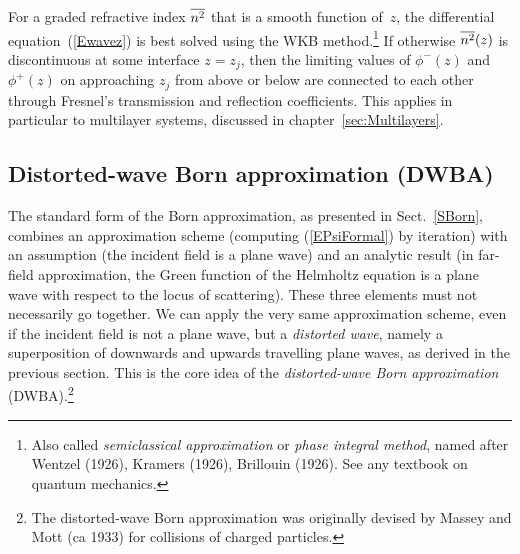 For a graded refractive index
%
$\overline{n^2}$ that is a smooth function of~$z$,
the differential equation~(\ref{Ewavez}) is best solved
using the WKB method.\footnote
{Also called \textit{semiclassical approximation} or
\textit{phase integral method},
named after Wentzel (1926), Kramers (1926), Brillouin (1926).
See any textbook on quantum mechanics.}
%
%
%
If otherwise $\overline{n^2}(z)$ is discontinuous at some interface $z=z_j$,
then the limiting values of $\phi^-(z)$ and $\phi^+(z)$
on approaching $z_j$ from above or below
are connected to each other through Fresnel's
transmission and reflection coefficients.
%
This applies in particular to multilayer systems,
discussed in chapter~\ref{sec:Multilayers}.

\subsection{Distorted-wave Born approximation (DWBA)}\label{SDWBA}

%
%

The standard form of the Born approximation,
as presented in Sect.~\ref{SBorn},
combines an approximation scheme
(computing (\ref{EPsiFormal}) by iteration)
with an assumption (the incident field is a plane wave)
and an analytic result
(in far-field approximation,
the Green function of the Helmholtz equation is a plane wave
with respect to the locus of scattering).
These three elements must not necessarily go together.
We can apply the very same approximation scheme,
even if the incident field is not a plane wave,
but a \textit{distorted wave},
namely a superposition of downwards and upwards travelling plane waves,
as derived in the previous section.
This is the core idea
of the \textit{distorted-wave Born approximation} (DWBA).\footnote
{The distorted-wave Born approximation
was originally devised by Massey and Mott (ca 1933)
for collisions of charged particles.}

